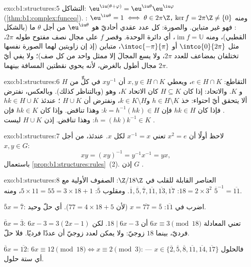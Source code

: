 \begin{solution}{exo:b1:structures:5}
التشاكل: $\eu^{\iu(\theta + \varphi)} =
\eu^{\iu\theta}\eu^{\iu\varphi}$ (\cref{thm:b1:complex:funceq}).
: $\eu^{\iu\theta} = 1 \iff \theta \in 2\pi\Z$، ومنه $\ker f =
2\pi\Z \neq \{0\}$: فهو غير متباين. والصورة: كل عدد عقدي أحاديّ  هو
$\eu^{\iu\theta}$ من أجل $\theta$ ما (بالشكل القطبي)، ومنه
$\operatorname{im} f = \mathbb{U}$، أي دائرة الوحدة. وقصر
$f$ على مجال نصف مفتوح طوله $2\pi$، مثل
$\intco{0}{2\pi}$ أو $\intoc{-\pi}{\pi}$، متباين (إذ إن زاويتين
لهما الصورة نفسها تختلفان بمضاعف للعدد $2\pi$، ولا يسع المجالَ
إلا ممثل واحد من كل صف)؛ ولا يفي أيّ مجال أطول بالغرض،
لأنه يحوي نقطتين المسافة بينهما $2\pi$.
\end{solution}

\begin{solution}{exo:b1:structures:6}
التقاطع: $e \in H \cap K$، ويعطي $x, y \in H \cap K$ أن
$xy^{-1}$ في كلٍّ من $H$ و $K$. والاتحاد: إذا كان $H \subseteq K$ كان الاتحاد
$K$، وهو  (وبالتناظر كذلك). وبالعكس، نفترض ألا يتحقق أيّ
احتواء: خذ $h \in H \setminus K$ و$k \in K \setminus
H$، ونفترض أن $H \cup K$ ؛ عندئذ $hk \in H \cup K$.
فإذا كان $hk \in H$ فإن $k = h^{-1}(hk) \in H$: وهذا تناقض. وإذا كان $hk \in
K$ فإن $h = (hk)k^{-1} \in K$: وهذا تناقض. إذن $H \cup K$ ليست
.
\end{solution}

\begin{solution}{exo:b1:structures:7}
لاحظ أولًا أن $x^2 = e$ تعني $x^{-1} = x$ لكل $x$. عندئذ، من أجل
$x, y \in G$:
\[
xy = (xy)^{-1} = y^{-1} x^{-1} = yx ,
\]
باستعمال \cref{prop:b1:structures:rules}~(2). إذن $G$ .
\end{solution}

\begin{solution}{exo:b1:structures:8}
العناصر القابلة للقلب في $\Z/18\Z$: الصفوف الأولية مع $18 = 2 \times 3^2$:
$\overline 1, \overline 5, \overline 7, \overline{11}, \overline{13},
\overline{17}$. ومقلوب $\overline 5$: $5 \times 11 = 55 = 3\times
18 + 1$، ومنه $\overline 5^{-1} = \overline{11}$.

$\overline 5 x = \overline 7$: اضرب في $\overline{11}$: $x =
\overline{77} = \overline 5$ (لأن $77 = 4\times 18 + 5$). أي حلّ
وحيد.

$\overline 6 x = \overline 3$: تعني المعادلة $6x \equiv 3 \pmod{18}$
أن $18 \mid 6x - 3$. لكن $6x - 3 = 3(2x - 1)$ فرديّ، بينما $18$
زوجيّ: ولا يمكن لعدد زوجيّ أن  عددًا فرديًا. فلا حلّ.

$\overline 6 x = \overline{12}$: $6x \equiv 12 \pmod{18} \iff x
\equiv 2 \pmod 3$: فالحلول $x \in \{\overline 2, \overline 5,
\overline 8, \overline{11}, \overline{14}, \overline{17}\}$ --- أي ستة
حلول.
\end{solution}

